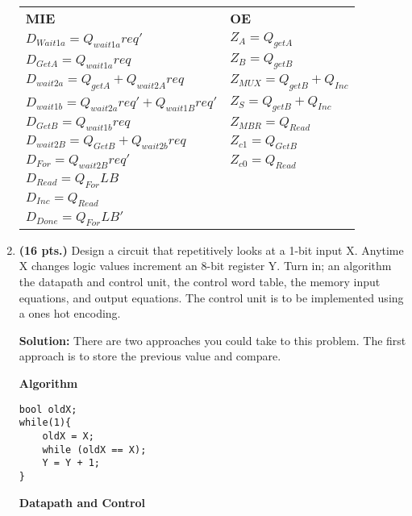 \begin{enumerate}
\begin{onlysolution}[fragile]
            \begin{tabular}{ll}
                \textbf{MIE}                                  & \textbf{OE}                    \\
                $D_{Wait1a}= Q_{wait1a}req'$                  & $Z_{A} = Q_{getA}$             \\
                $D_{GetA } = Q_{wait1a}req$                   & $Z_{B} = Q_{getB}$             \\
                $D_{wait2a}= Q_{getA} + Q_{wait2A}req$        & $Z_{MUX} = Q_{getB} + Q_{Inc}$ \\
                $D_{wait1b}= Q_{wait2a}req' + Q_{wait1B}req'$ & $Z_{S} = Q_{getB} + Q_{Inc}$   \\
                $D_{GetB } = Q_{wait1b}req$                   & $Z_{MBR} = Q_{Read}$           \\
                $D_{wait2B}= Q_{GetB} + Q_{wait2b}req$        & $Z_{c1} = Q_{GetB}$            \\
                $D_{For  } = Q_{wait2B}req'$                  & $Z_{c0} = Q_{Read}$            \\
                $D_{Read } = Q_{For}LB$                       &                                \\
                $D_{Inc  } = Q_{Read}$                        &                                \\
                $D_{Done } = Q_{For}LB'$                      &                                \\
            \end{tabular}
        \end{onlysolution}

    \item  \textbf{ (16 pts.)}
        Design a circuit that repetitively looks at a 1-bit input X.
        Anytime X changes logic values increment an 8-bit
        register Y.
        Turn in; an algorithm the datapath and control unit, the control word
        table, the memory input equations, and output equations.
        The control unit is to be implemented using a ones hot encoding.
        \begin{onlysolution}[fragile]\par\textbf{Solution:} There are two approaches you
            could take to this problem. The first approach is to store the previous value
            and compare.\par
            \textbf{Algorithm}
              \begin{verbatim}
bool oldX;
while(1){
    oldX = X;
    while (oldX == X);
    Y = Y + 1;
}
\end{verbatim}
            \textbf{Datapath and Control}


\end{onlysolution}
\end{enumerate}
